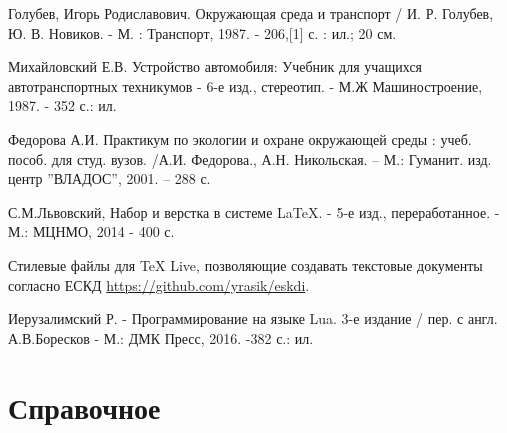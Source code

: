 \begin{thebibliography}{99}
   Голубев, Игорь Родиславович. Окружающая среда и транспорт / И. Р. Голубев, Ю. В. Новиков. - М. : Транспорт, 1987. - 206,[1] с. : ил.; 20 см.

   Михайловский Е.В. Устройство автомобиля: Учебник для учащихся автотранспортных техникумов - 6-е изд., стереотип. - М.Ж Машиностроение, 1987. - 352 с.: ил.

   Федорова А.И. Практикум по экологии и охране окружающей среды : учеб. пособ. для студ. вузов. /А.И. Федорова., А.Н. Никольская. – М.: Гуманит. изд. центр ''ВЛАДОС'', 2001. – 288 с.

   С.М.Львовский, Набор и верстка в системе LaTeX. - 5-е изд., переработанное. - М.: МЦНМО, 2014 - 400 с.

   Стилевые файлы для TeX Live, позволяющие создавать текстовые документы согласно ЕСКД \url{https://github.com/yrasik/eskdi}.

   Иерузалимский Р. - Программирование на языке Lua. 3-е издание / пер. с англ. А.В.Боресков - М.: ДМК Пресс, 2016. -382 с.: ил.

\end{thebibliography}





\appendix %


\section[Коэффициенты для расчета уровня загрязнения СО]{Справочное} \label{app:tables}


